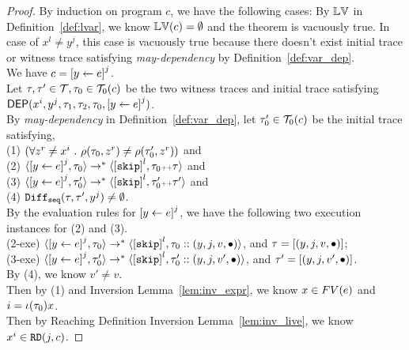 \begin{proof}
  By induction on program $c$, we have the following cases:
  By $\mathbb{LV}$ in Definition~\ref{def:lvar}, we know $\mathbb{LV}(c) = \emptyset$ and the theorem is vacuously true.
  In case of $x^l \neq y^j$, this case is vacuously true because there doesn't 
  exist initial trace or witness trace satisfying \emph{may-dependency} by Definition~\ref{def:var_dep}.
  \\
  We have $c = \clabel{\assign{y}{\expr}}^j$.
  \\
  Let $\mathtt{\tau}, \mathtt{\tau}' \in \mathcal{T}, \mathtt{\tau}_0 \in \mathcal{T}_0(c)$ be the two witness traces and initial trace satisfying 
  $\dep(x^i, y^j, \trace_1, \trace_2, \trace_0, \clabel{\assign{y}{\expr}}^j )$.
  \\
  By \emph{may-dependency} in Definition~\ref{def:var_dep},
  let $\mathtt{\tau}_0' \in \mathcal{T}_0(c)$ be the initial trace satisfying,
  \\
  (1) $ (\forall z^r \neq x^i ~.~     \rho(\mathtt{\tau}_0, z^r ) \neq   \rho(\mathtt{\tau}_0',z^r) )$
  and \\
  (2) $\config{\clabel{\assign{y}{\expr}}^j , \trace_0} 
  \rightarrow^{*} \config{\clabel{\eskip}^l, \trace_0  \tracecat \trace } $ 
    and \\
  (3) $\config{\clabel{\assign{y}{\expr}}^j, \trace_0'} 
  \rightarrow^{*} \config{\clabel{\eskip}^l, \trace_0'  \tracecat \trace'}$ 
    and \\
    (4) $\mathtt{Diff}_{\mathtt{seq}}(\mathtt{\tau}, \mathtt{\tau}', y^j ) \neq \emptyset$.
    \\
    By the evaluation rules for $\clabel{\assign{y}{\expr}}^j$, we have the following two execution instances for 
    (2) and (3).
    \\
    (2-exe) $\config{\clabel{\assign{y}{\expr}}^j , \trace_0} 
    \rightarrow^{*} \config{\clabel{\eskip}^l, \trace_0 :: (y,j, v, \bullet)  } $, and $\mathtt{\tau} = [(y,j, v, \bullet)]$;
    \\
    (3-exe) $\config{\clabel{\assign{y}{\expr}}^j, \trace_0'} 
    \rightarrow^{*} \config{\clabel{\eskip}^l, \trace_0' :: (y,j, v', \bullet) }$,   and $\mathtt{\tau}' = [(y,j, v', \bullet)]$.
    \\
    By (4), we know $v' \neq v$.
    \\
    Then by (1) and Inversion Lemma~\ref{lem:inv_expr}, we know $x \in FV(e)$ and $i = \iota(\mathtt{\tau}_0)x$.
    \\
    Then by Reaching Definition Inversion Lemma~\ref{lem:inv_live}, we know $x^i \in \mathtt{RD}(j, c)$.

\end{proof}

